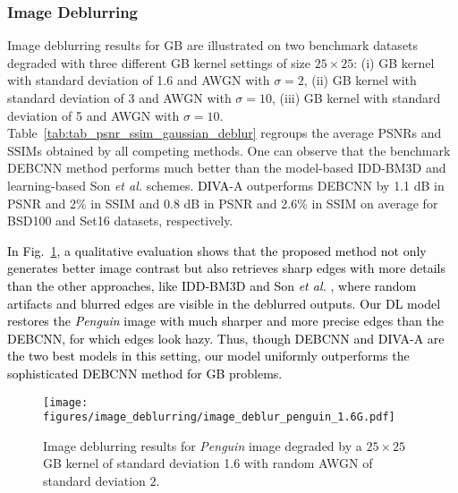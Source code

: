 \documentclass[10pt,journal,compsoc]{IEEEtran}
\newcommand{\sd}{\textcolor{black}}
\newcommand{\dk}{\textcolor{black}}
\begin{document}
\subsubsection{Image Deblurring}
\label{sec:result_deblur}

Image deblurring results for GB are illustrated on two benchmark datasets degraded with three different GB kernel settings of size $25 \times 25$: (i) GB kernel with standard deviation of 1.6 and AWGN with $\sigma=2$,
(ii) GB kernel with standard deviation of 3 and AWGN with $\sigma=10$,
(iii) GB kernel with standard deviation of 5 and AWGN with $\sigma=10$.
Table~\ref{tab:tab_psnr_ssim_gaussian_deblur} regroups the average PSNRs and SSIMs obtained by all competing methods. One can observe that the benchmark DEBCNN \cite{Wang2018training} method performs much better than the model-based IDD-BM3D \cite{Danielyan2012bm3d} and learning-based Son \textit{et al.} \cite{Son2017fast} schemes. \dk{DIVA}-A outperforms DEBCNN by 1.1 dB in PSNR and 2\% in SSIM and 0.8 dB in PSNR and 2.6\% in SSIM on average for BSD100 and Set16 datasets, respectively.


\sd{In Fig.~\ref{fig:image_deblurG}, a qualitative evaluation shows that the proposed method not only generates better image contrast but also retrieves sharp edges with more details than the other approaches, like IDD-BM3D and Son \textit{et al.} \cite{Son2017fast}, where random artifacts and blurred edges are visible in the deblurred outputs.
Our DL model restores the \textit{Penguin} image with much sharper and more precise edges than the DEBCNN, for which edges look hazy.
Thus, though DEBCNN and \dk{DIVA}-A are the two best models in this setting, our model uniformly outperforms the sophisticated DEBCNN method for GB problems.}









\begin{figure}[t!]
\begin{centering}


\texttt{[image: figures/image\_deblurring/image\_deblur\_penguin\_1.6G.pdf]}

\end{centering}
\caption{Image deblurring results for \textit{Penguin} image degraded by a $25 \times 25$ GB kernel of standard deviation 1.6 with random AWGN of standard deviation $2$.}
\label{fig:image_deblurG}
\end{figure}
\end{document}
